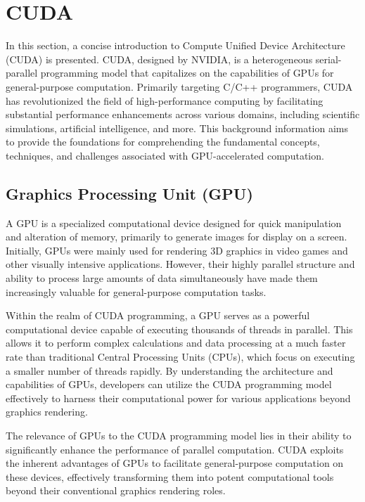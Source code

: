 \section{CUDA}
\label{sec:cuda}

In this section, a concise introduction to Compute Unified Device Architecture (CUDA) is presented. 
CUDA, designed by NVIDIA, is a heterogeneous serial-parallel programming model\cite{marcmwpcwpslides} that capitalizes on 
the capabilities of GPUs for general-purpose computation. Primarily 
targeting C/C++ programmers, CUDA has revolutionized the field of high-performance computing by 
facilitating substantial performance enhancements across various domains, including scientific 
simulations, artificial intelligence, and more. This background information aims to provide the 
foundations for comprehending the fundamental concepts, techniques, and challenges associated with 
GPU-accelerated computation.\cite{cuda2016best}

\subsection{Graphics Processing Unit (GPU)}
\label{sec:gpu}
A GPU is a specialized computational device designed for quick manipulation and alteration of memory, 
primarily to generate images for display on a screen. Initially, GPUs were mainly used for rendering 3D graphics in video games 
and other visually intensive applications. However, their highly parallel structure and ability to process large amounts of data 
simultaneously have made them increasingly valuable for general-purpose computation tasks.

Within the realm of CUDA programming, a GPU serves as a powerful computational device capable of executing thousands of threads in 
parallel. This allows it to perform complex calculations and data processing at a much faster rate than traditional Central Processing 
Units (CPUs), which focus on executing a smaller number of threads rapidly. By understanding the architecture and capabilities of GPUs, 
developers can utilize the CUDA programming model effectively to harness their computational power for various applications beyond 
graphics rendering.

The relevance of GPUs to the CUDA programming model lies in their ability to significantly enhance the 
performance of parallel computation. CUDA exploits the inherent advantages of GPUs to facilitate 
general-purpose computation on these devices, effectively transforming them into potent computational 
tools beyond their conventional graphics rendering roles\cite{cuda2016best}.

